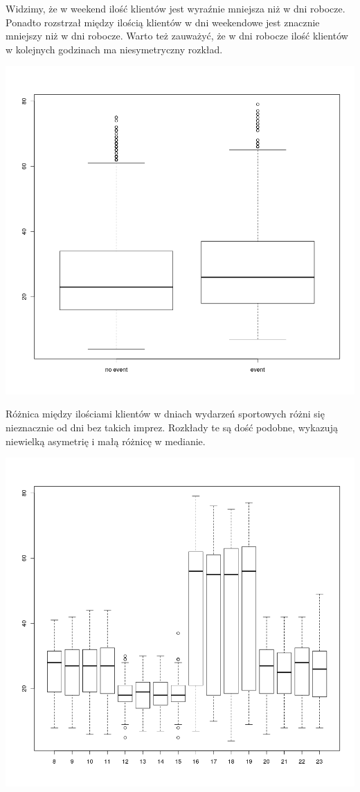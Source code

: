 \documentclass[a4paper,11pt]{article}
\begin{document}
Widzimy, że w weekend ilość klientów jest wyraźnie mniejsza niż w dni robocze. Ponadto rozstrzał między ilością klientów  w dni weekendowe jest znacznie mniejszy niż w dni robocze. Warto też zauważyć, że w dni robocze ilość klientów w kolejnych godzinach ma niesymetryczny rozkład. 

\includegraphics[scale=.7]{boxplot2.png} 

Różnica między ilościami klientów w dniach wydarzeń sportowych różni się nieznacznie od dni bez takich imprez. Rozkłady te są dość podobne, wykazują niewielką asymetrię i małą różnicę w medianie.

\includegraphics[scale=.7]{boxplot3.png} 
\end{document}
